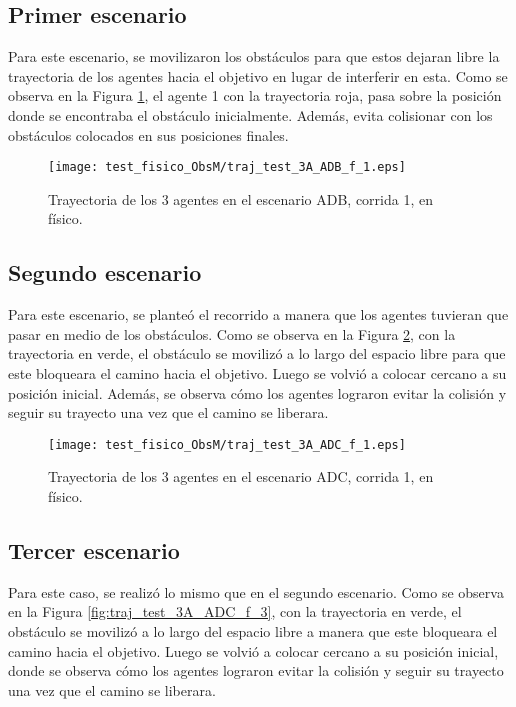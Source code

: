 \subsection{Primer escenario}
Para este escenario, se movilizaron los obstáculos para que estos dejaran libre la trayectoria de los agentes hacia el objetivo en lugar de interferir en esta. Como se observa en la Figura \ref{fig:traj_test_3A_ADB_f_1}, el agente 1 con la trayectoria roja, pasa sobre la posición donde se encontraba el obstáculo inicialmente. Además, evita colisionar con los obstáculos colocados en sus posiciones finales. 

\begin{figure}[H]
	\centering
	\texttt{[image: test\_fisico\_ObsM/traj\_test\_3A\_ADB\_f\_1.eps]}
	\caption{Trayectoria de los 3 agentes en el escenario ADB, corrida 1, en físico.}
	\label{fig:traj_test_3A_ADB_f_1}
\end{figure}

\subsection{Segundo escenario}
Para este escenario, se planteó el recorrido a manera que los agentes tuvieran que pasar en medio de los obstáculos. Como se observa en la Figura \ref{fig:traj_test_3A_ADC_f_1}, con la trayectoria en verde, el obstáculo se movilizó a lo largo del espacio libre para que este bloqueara el camino hacia el objetivo. Luego se volvió a colocar cercano a su posición inicial. Además, se observa cómo los agentes lograron evitar la colisión y seguir su trayecto una vez que el camino se liberara.
\begin{figure}[H]
	\centering
	\texttt{[image: test\_fisico\_ObsM/traj\_test\_3A\_ADC\_f\_1.eps]}
	\caption{Trayectoria de los 3 agentes en el escenario ADC, corrida 1, en físico.}
	\label{fig:traj_test_3A_ADC_f_1}
\end{figure}

\subsection{Tercer escenario}
Para este caso, se realizó lo mismo que en el segundo escenario. Como se observa en la Figura \ref{fig:traj_test_3A_ADC_f_3}, con la trayectoria en verde, el obstáculo se movilizó a lo largo del espacio libre a manera que este bloqueara el camino hacia el objetivo. Luego se volvió a colocar cercano a su posición inicial, donde se observa cómo los agentes lograron evitar la colisión y seguir su trayecto una vez que el camino se liberara.

